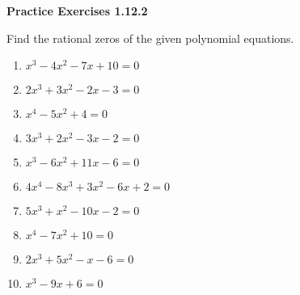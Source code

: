 \vspace{0.3ex}
\noindent\textbf{Practice Exercises 1.12.2}

\vspace{0.2ex}

Find the rational zeros of the given polynomial equations.
\begin{multicols}{2}
\begin{enumerate}
    \item $x^3 - 4x^2 - 7x + 10 = 0$
    \item $2x^3 + 3x^2 - 2x - 3 = 0$
    \item $x^4 - 5x^2 + 4 = 0$
    \item $3x^3 + 2x^2 - 3x - 2 = 0$
    \item $x^3 - 6x^2 + 11x - 6 = 0$
    \item $4x^4 - 8x^3 + 3x^2 - 6x + 2 = 0$
    \item $5x^3 + x^2 - 10x - 2 = 0$
    \item $x^4 - 7x^2 + 10 = 0$
    \item $2x^3 + 5x^2 - x - 6 = 0$
    \item $x^3 - 9x + 6 = 0$
    \end{enumerate}
    \end{multicols}
